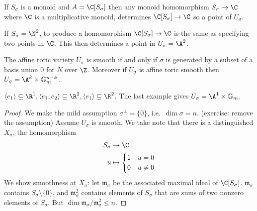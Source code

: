\documentclass[a4paper]{article}
\begin{document}
If \(S_\sigma\) is a monoid and \(A = \C[S_\sigma]\) then any monoid homomorphism \(S_\sigma \to \C\) where \(\C\) is a multiplicative monoid, determines \(\C[S_\sigma] \to \C\) so a point of \(U_\sigma\).

\begin{eg}
  If \(S_\sigma = \N^2\), to produce a homomorphism \(\C[S_\sigma] \to \C\) is the same as specifying two points in \(\C\). This then determines a point in \(U_\sigma = \A^2\).
\end{eg}

\begin{proposition}
  The affine toric variety \(U_\sigma\) is smooth if and only if \(\sigma\) is generated by a subset of a basis union \(0\) for \(N\) over \(\Z\). Moreover if \(U_\sigma\) is affine toric smooth then \(U_\sigma = \A^k \times \mathbb G_m^{n - k}\).
\end{proposition}


\begin{eg}
  \(\langle e_1\rangle \subseteq \R^1, \langle e_1, e_2 \rangle \subseteq \R^2, \langle e_1 \rangle \subseteq \R^2\). The last example gives \(U_\sigma = \A^1 \times \mathbb G_m\).
\end{eg}

\begin{proof}
  We make the mild assumption \(\sigma^\perp = \{0\}\), i.e.\ \(\dim \sigma = n\). (exercise: remove the assumption) Assume \(U_\sigma\) is smooth. We take note that there is a distinguished \(X_\sigma\), the homomorphism
  \begin{align*}
    S_\sigma &\to \C \\
    u &\mapsto
        \begin{cases}
          1 & u = 0 \\
          0 & u \neq 0
        \end{cases}
  \end{align*}
  We show smoothness at \(X_\sigma\): let \(\mathfrak m_\sigma\) be the associated maximal ideal of \(\C[S_\sigma]\). \(\mathfrak m_\sigma\) contains \(S_\sigma \setminus \{0\}\), and \(\mathfrak m_\sigma^2\) contains elements of \(S_\sigma\) that are sums of two nonzero elements of \(S_\sigma\). But \(\dim \mathfrak m_\sigma/\mathfrak m_\sigma^2 \leq n\).
\end{proof}
\end{document}
